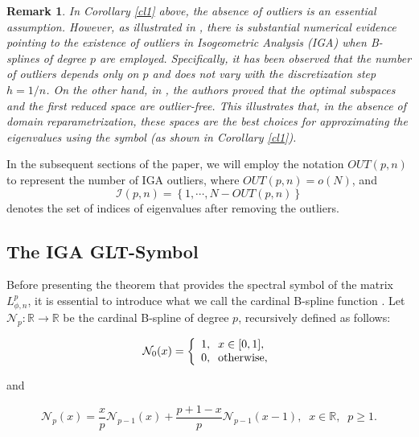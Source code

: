 \documentclass[11pt]{article}
\newtheorem{remark}{Remark}[section]
\begin{document}
\begin{remark}  
In  Corollary \ref{cl1} above, the absence of outliers is an essential assumption. However, as illustrated in \cite[Chapter 5.1.2, p. 153]{cottrell2009isogeometric}, there is substantial numerical evidence pointing to the existence of outliers in Isogeometric Analysis (IGA) when B-splines of degree $p$ are employed. Specifically, it has been observed that the number of outliers depends only on $p$ and does not vary with the discretization step $h=1/n$. On the other hand, in \cite{manni2022application}, the authors proved that the optimal subspaces and the first reduced space are outlier-free. This illustrates that, in the absence of domain reparametrization, these spaces are the best choices for approximating the eigenvalues using the symbol (as shown in Corollary \ref{cl1}).  
\end{remark}  

In the subsequent sections of the paper, we will employ the notation $OUT(p, n)$ to represent the number of IGA outliers, where $OUT(p,n)=o(N)$, and  
\begin{equation}\label{setofnooutliers}  
    \mathcal{I}(p, n) = \left \{1, \cdots, N - OUT(p,n) \right \}  
\end{equation}  
 denotes the set of indices of eigenvalues after removing the outliers.  


\subsection{The IGA GLT-Symbol}\label{symbol}
Before presenting the theorem that provides the spectral symbol of the matrix \(L^{p}_{\phi,n}\), it is essential to introduce what we call the  cardinal B-spline function \cite{de1978practical}. Let \(\mathcal{N}_p: \mathbb{R}\longrightarrow\mathbb{R} \) be the cardinal B-spline of degree \(p\), recursively defined as follows:  

\begin{equation}\label{eq:cardinal-B-spline-1}  
\mathcal{N}_0(x)=\left\{  
\begin{array}{ll}  
1,\;\;x\in[0,1],\\  
0,\;\;\text{otherwise},  
\end{array}  
\right.  
\vspace{-0.25cm}    
\end{equation}  

and  

\begin{equation}\label{eq:cardinal-B-spline-2}  
\mathcal{N}_p(x)=\frac{x}{p}\mathcal{N}_{p-1}(x)+\frac{p+1-x}{p}\mathcal{N}_{p-1}(x-1),\;\;x\in\mathbb{R},\;\;p\geq 1.  
\end{equation}  
\end{document}
